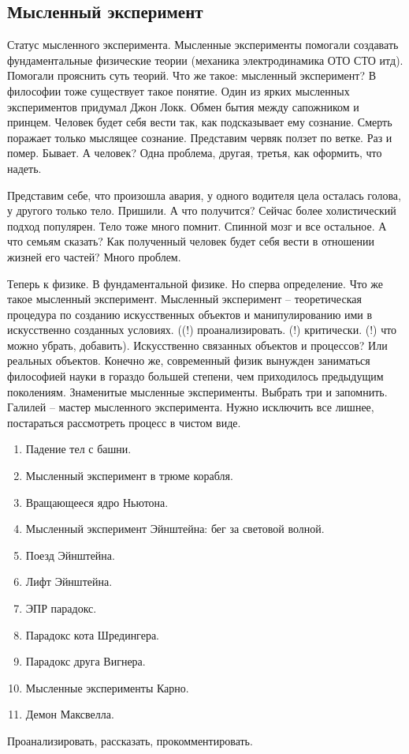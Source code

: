 \documentclass[a4paper, 12pt]{article}
\begin{document}

\subsection{Мысленный эксперимент}

Статус мысленного эксперимента.
Мысленные эксперименты помогали создавать фундаментальные физические 
теории (механика электродинамика ОТО СТО итд). Помогали прояснить суть 
теорий.
%
Что же такое: мысленный эксперимент? В философии тоже существует такое 
понятие. Один из ярких мысленных экспериментов придумал Джон Локк. Обмен 
бытия между сапожником и принцем. Человек будет себя вести так, как 
подсказывает ему сознание. Смерть поражает только мыслящее сознание. 
Представим червяк ползет по ветке. Раз и помер. Бывает. А человек? Одна 
проблема, другая, третья, как оформить, что надеть.

Представим себе, что произошла авария, у одного водителя цела осталась 
голова, у другого только тело. Пришили. А что получится? Сейчас более 
холистический подход популярен. Тело тоже много помнит. Спинной мозг 
и все остальное. А что семьям сказать? Как полученный человек будет себя 
вести в отношении жизней его частей? Много проблем.

Теперь к физике. В фундаментальной физике. Но сперва определение. Что же 
такое мысленный эксперимент.
%
Мысленный эксперимент -- теоретическая процедура по созданию 
искусственных объектов и манипулированию ими в искусственно созданных 
условиях. ((!) проанализировать. (!) критически. (!) что можно убрать, 
добавить). Искусственно связанных объектов и процессов? Или реальных 
объектов.
%
Конечно же, современный физик вынужден заниматься философией науки 
в гораздо большей степени, чем приходилось предыдущим поколениям.
%
Знаменитые мысленные эксперименты. Выбрать три и запомнить.
Галилей -- мастер мысленного эксперимента. Нужно исключить все 
лишнее, постараться рассмотреть процесс в чистом виде.
\begin{enumerate}
  \item Падение тел с башни.
  \item Мысленный эксперимент в трюме корабля.
  \item Вращающееся ядро Ньютона.
  \item Мысленный эксперимент Эйнштейна: бег за световой волной.
  \item Поезд Эйнштейна.
  \item Лифт Эйнштейна.
  \item ЭПР парадокс.
  \item Парадокс кота Шредингера.
  \item Парадокс друга Вигнера.
  \item Мысленные эксперименты Карно.
  \item Демон Максвелла.
\end{enumerate}
Проанализировать, рассказать, прокомментировать.
\end{document}
